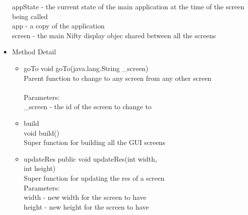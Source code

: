 \documentclass[letterpaper]{article}
\begin{document}
\begin{itemize}
										appState - the current state of the main application at the time of the screen being called \\
										app - a copy of the application \\
										screen - the main Nifty display objec shared between all the screens \\
								\item	Method Detail
										\begin{itemize}
\item goTo 
void goTo(java.lang.String \_screen) \\
Parent function to change to any screen from any other screen \\ \\
Parameters: \\
        \_screen - the id of the screen to change to \\


											\item	
    build \\
    void build() \\

    Super function for building all the GUI screens \\
    \item updateRes
    public void updateRes(int width, \\
                 int height) \\
    Super function for updating the res of a screen \\
    Parameters: \\
        width - new width for the screen to have \\
        height - new height for the screen to have \\

 

										\end{itemize}
							\end{itemize}
							
\end{document}
